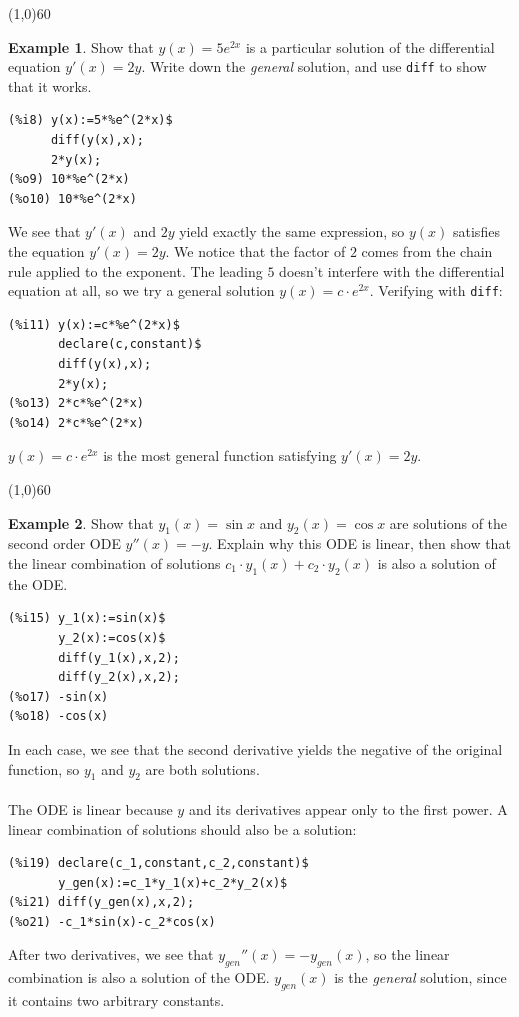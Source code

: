 \documentclass[10.5pt,twoside]{report}
\theoremstyle{definition}
\newtheorem{exmp}{Example}[section]
\begin{document}
\line(1,0){60}
\linethickness{0.5mm}

\begin{exmp} Show that $y(x)=5e^{2x}$ is a particular solution of the differential equation $y'(x)=2y$.  Write down the \textit{general} solution, and use \verb|diff| to show that it works.

\begin{verbatim}
(%i8) y(x):=5*%e^(2*x)$
      diff(y(x),x);
      2*y(x);
(%o9) 10*%e^(2*x)
(%o10) 10*%e^(2*x)
\end{verbatim}

We see that $y'(x)$ and $2y$ yield exactly the same expression, so $y(x)$ satisfies the equation $y'(x)=2y$.  We notice that the factor of $2$ comes from the chain rule applied to the exponent.  The leading $5$ doesn't interfere with the differential equation at all, so we try a general solution $y(x)=c\cdot e^{2x}$.  Verifying with \verb|diff|:

\begin{verbatim}
(%i11) y(x):=c*%e^(2*x)$
       declare(c,constant)$
       diff(y(x),x);
       2*y(x);
(%o13) 2*c*%e^(2*x)
(%o14) 2*c*%e^(2*x)
\end{verbatim}

$y(x)=c\cdot e^{2x}$ is the most general function satisfying $y'(x)=2y$.


\end{exmp}

\line(1,0){60}
\linethickness{0.5mm}


\begin{exmp} Show that $y_1(x)=\sin{x}$ and $y_2(x)=\cos{x}$ are solutions of the second order ODE $y''(x)=-y$.  Explain why this ODE is linear, then show that the linear combination of solutions $c_1\cdot y_1(x)+ c_2\cdot y_2(x)$ is also a solution of the ODE.\\

\begin{verbatim}
(%i15) y_1(x):=sin(x)$
       y_2(x):=cos(x)$
       diff(y_1(x),x,2);
       diff(y_2(x),x,2);
(%o17) -sin(x)
(%o18) -cos(x)
\end{verbatim}

In each case, we see that the second derivative yields the negative of the original function, so $y_1$ and $y_2$ are both solutions. \\
${}$\\
The ODE is linear because $y$ and its derivatives appear only to the first power.  A linear combination of solutions should also be a solution:\\

\begin{verbatim}
(%i19) declare(c_1,constant,c_2,constant)$
       y_gen(x):=c_1*y_1(x)+c_2*y_2(x)$
(%i21) diff(y_gen(x),x,2);
(%o21) -c_1*sin(x)-c_2*cos(x)
\end{verbatim}

After two derivatives, we see that $y_{gen}''(x)=-y_{gen}(x)$, so the linear combination is also a solution of the ODE.   $y_{gen}(x)$ is the \textit{general} solution, since it contains two arbitrary constants.


\end{exmp}
\end{document}
